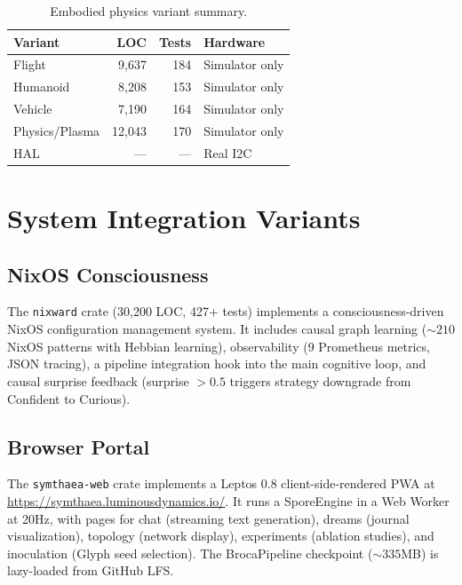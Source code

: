 \documentclass[11pt,twocolumn]{article}
\begin{document}
\begin{table}[H]
\centering
\caption{Embodied physics variant summary.}
\label{tab:embodied-summary}
\begin{tabular}{lrrl}
\toprule
\textbf{Variant} & \textbf{LOC} & \textbf{Tests} & \textbf{Hardware} \\
\midrule
Flight & 9,637 & 184 & Simulator only \\
Humanoid & 8,208 & 153 & Simulator only \\
Vehicle & 7,190 & 164 & Simulator only \\
Physics/Plasma & 12,043 & 170 & Simulator only \\
HAL & --- & --- & Real I2C \\
\bottomrule
\end{tabular}
\end{table}

\section{System Integration Variants}
\label{sec:system}

\subsection{NixOS Consciousness}

The \texttt{nixward} crate (30,200 LOC, 427+ tests) implements a consciousness-driven NixOS configuration management system. It includes causal graph learning (${\sim}210$ NixOS patterns with Hebbian learning), observability (9 Prometheus metrics, JSON tracing), a pipeline integration hook into the main cognitive loop, and causal surprise feedback (surprise $> 0.5$ triggers strategy downgrade from Confident to Curious).

\subsection{Browser Portal}

The \texttt{symthaea-web} crate implements a Leptos 0.8 client-side-rendered PWA at \url{https://symthaea.luminousdynamics.io/}. It runs a SporeEngine in a Web Worker at 20Hz, with pages for chat (streaming text generation), dreams (journal visualization), topology (network display), experiments (ablation studies), and inoculation (Glyph seed selection). The BrocaPipeline checkpoint (${\sim}335$MB) is lazy-loaded from GitHub LFS.
\end{document}
